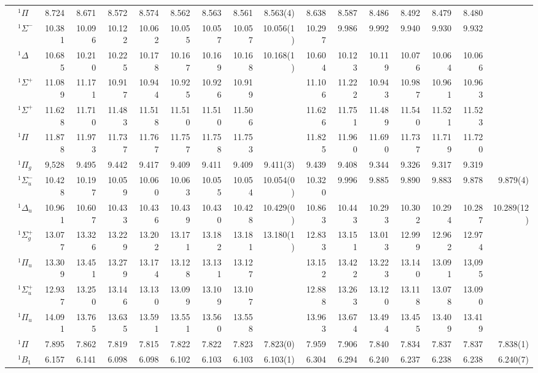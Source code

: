 \documentclass[aip,jcp,reprint,noshowkeys,superscriptaddress]{revtex4-1}
\begin{document}
\begin{squeezetable}
\begin{table}
\begin{ruledtabular}
\begin{tabular}{llrrrrrrrrrrrrrrr}
	\ce{CO}		&	$^1\Pi$ 		&8.724	&8.671	&8.572	&8.574	&8.562	&8.563	&8.561	&8.563(4)	&8.638	&8.587	&8.486	&8.492	&8.479	&8.480	&	\\
				&	$^1\Sigma^-$ 	&10.381	&10.096	&10.122	&10.062	&10.055	&10.057	&10.057	&10.056(1)	&10.297	&9.986	&9.992	&9.940	&9.930	&9.932	&	\\
				&	$^1\Delta$ 		&10.685	&10.210	&10.225	&10.178	&10.167	&10.169	&10.168	&10.168(1)	&10.604	&10.123	&10.119	&10.076	&10.064	&10.066	&	\\
				&	$^1\Sigma^+$ 	&11.089	&11.171	&10.917	&10.944	&10.925	&10.926	&10.919	&			&11.106	&11.222	&10.943	&10.987	&10.961	&10.963	&	\\
				&	$^1\Sigma^+$ 	&11.628	&11.710	&11.483	&11.518	&11.510	&11.510	&11.506	&			&11.626	&11.751	&11.489	&11.540	&11.521	&11.523	&	\\
				&	$^1\Pi$ 		&11.878	&11.973	&11.737	&11.767	&11.757	&11.758	&11.753	&			&11.825	&11.960	&11.690	&11.737	&11.719	&11.720	&	\\
	\ce{N2}		&	$^1\Pi_g$  		&9,528	&9.495	&9.442	&9.417	&9.409	&9.411	&9.409	&9.411(3)	&9.439	&9.408	&9.344	&9.326	&9.317	&9.319	&	\\
				&	$^1\Sigma_u^-$	&10.428	&10.197	&10.059	&10.060	&10.063	&10.055	&10.054	&10.054(0)	&10.320	&9.996	&9.885	&9.890	&9.883	&9.878	&9.879(4)\\
				&	$^1\Delta_u$ 	&10.961	&10.607	&10.433	&10.436	&10.439	&10.430	&10.428	&10.429(0)	&10.863	&10.443	&10.293	&10.302	&10.294	&10.287	&10.289(12)\\
				&	$^1\Sigma_g^+$	&13.077	&13.326	&13.229	&13.202	&13.171	&13.182	&13.181	&13.180(1)	&12.833	&13.151	&13.013	&12.999	&12.962	&12.974	&	\\
				&	$^1\Pi_u$  		&13.309	&13.451	&13.279	&13.174	&13.128	&13.131	&13.127	&			&13.152	&13.422	&13.223	&13.140	&13.091	&13,095	&	\\
				&	$^1\Sigma_u^+$	&12.937	&13.250	&13.146	&13.130	&13.099	&13.109	&13.107	&			&12.888	&13.263	&13.120	&13.118	&13.078	&13.090	&	\\
				&	$^1\Pi_u$ 		&14.091	&13.765	&13.635	&13.591	&13.551	&13.560	&13.558	&			&13.963	&13.674	&13.494	&13.455	&13.409	&13.419\\
	\ce{HCl}	&	$^1\Pi$ 		&7.895	&7.862	&7.819	&7.815	&7.822	&7.822	&7.823	&7.823(0)	&7.959	&7.906	&7.840	&7.834	&7.837	&7.837	&7.838(1)\\
	\ce{H2S}	&	$^1B_1$  		&6.157	&6.141	&6.098	&6.098	&6.102	&6.103	&6.103	&6.103(1)	&6.304	&6.294	&6.240	&6.237	&6.238	&6.238	&6.240(7)\\

\end{tabular}
\end{ruledtabular}
\end{table}
\end{squeezetable}
\end{document}
